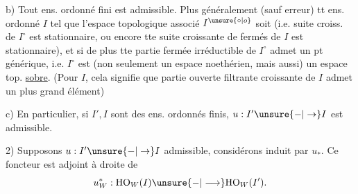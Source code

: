 b) Tout ens. ordonné fini est admissible. Plus généralement (sauf erreur) tt ens. ordonné $I$ tel que l'espace topologique associé  $I^{\unsure{\circ|o}}$ soit  (i.e.  suite croiss.  de $I^\circ$ est stationnaire, ou encore tte suite croissante de fermés de $I$ est stationnaire), et si de plus tte partie fermée irréductible de $I^\circ$ admet un pt générique, i.e. $I^\circ$ est (non seulement un espace noethérien, mais aussi) un espace top. \uline{sobre}. (Pour $I$, cela signifie que  partie ouverte filtrante croissante de $I$ admet un plus grand élément\deleted{\unsure{)}})

c) En particulier, si $I',I$  sont des ens. ordonnés finis,  $u:I'\unsure{-|\to}I$ est admissible.

2) Supposons $u:I'\unsure{-|\to}I$ admissible,   considérons
induit par $u_*$. Ce foncteur est adjoint à droite de
\[
u_W^*:\mathrm{HO}_W(I)\unsure{-|\longrightarrow}\mathrm{HO}_W(I').
\]
